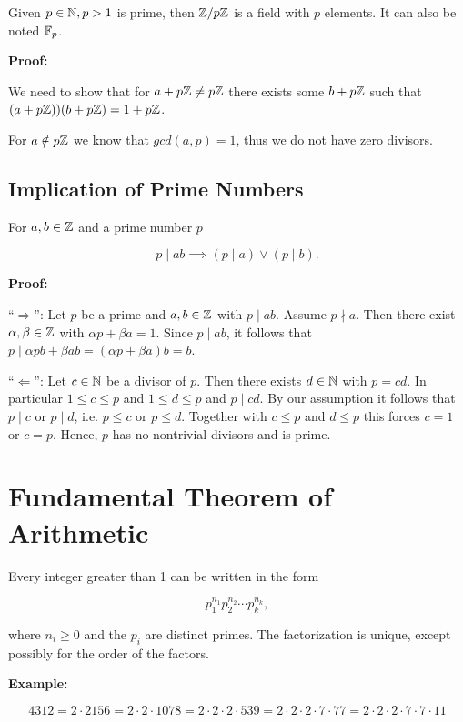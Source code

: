 Given \(p \in \mathbb{N}, p > 1\) is prime, then \(\mathbb{Z} / p \mathbb{Z}\) is a field with \(p\) elements. It can also
be noted \(\mathbb{F}_p\).

\textbf{Proof:}

We need to show that for \(a + p \mathbb{Z} \ne p \mathbb{Z}\) there exists some \(b + p \mathbb{Z}\) such that \((a + p\mathbb{Z}))(b + p\mathbb{Z}) = 1 + p\mathbb{Z}\).

For \(a \notin p \mathbb{Z}\) we know that \(gcd(a,p) = 1\), thus we do not have zero divisors.

\subsection{Implication of Prime Numbers}

For \(a, b \in \mathbb{Z}\) and a prime number \(p\)

\[
	p \mid ab \implies (p \mid a ) \lor (p \mid b).
\]

\textbf{Proof:}

``\(\Rightarrow\)'': Let \(p\) be a prime and \(a,b \in \mathbb{Z}\) with \(p \mid ab\). Assume \(p \nmid a\). Then there exist \(\alpha,\beta \in \mathbb{Z}\)
with \(\alpha p + \beta a = 1\). Since \(p \mid ab\), it follows that \(p \mid \alpha p b + \beta ab = (\alpha p + \beta a)b = b\).

``\(\Leftarrow\)'': Let \(c \in \mathbb{N}\) be a divisor of \(p\). Then there exists \(d \in \mathbb{N}\) with \(p = cd\). In particular \(1 \le c \le p\) and
\(1 \le d \le p\) and \(p \mid cd\). By our assumption it follows that \(p \mid c\) or \(p \mid d\), i.e. \(p \le c\) or \(p \le d\). Together with
\(c \le p\) and \(d \le p\) this forces \(c = 1\) or \(c = p\). Hence, \(p\) has no nontrivial divisors and is prime.

\QED

\section{Fundamental Theorem of Arithmetic}

Every integer greater than 1 can be written in the form

\[
	p_1^{n_1}p_2^{n_2} \cdots p_k^{n_k},
\]

where \(n_i \geq 0\) and the \(p_i\) are distinct primes. The factorization is unique, except possibly for
the order of the factors.

\textbf{Example:}

\[
	4312 = 2 \cdot 2156 = 2 \cdot 2 \cdot 1078 = 2 \cdot 2 \cdot 2 \cdot 539 = 2 \cdot 2 \cdot 2 \cdot 7
	\cdot 77 = 2 \cdot 2 \cdot 2 \cdot 7 \cdot 7 \cdot 11
\]

